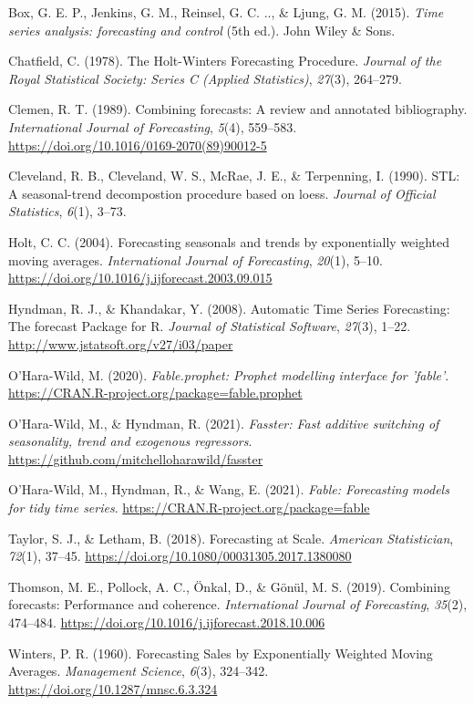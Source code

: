 \begin{appendix}
\hypertarget{refs}{}
\leavevmode\hypertarget{ref-Box2015}{}%
Box, G. E. P., Jenkins, G. M., Reinsel, G. C. .., \& Ljung, G. M.
(2015). \emph{Time series analysis: forecasting and control} (5th ed.).
John Wiley \& Sons.

\leavevmode\hypertarget{ref-Chatfield1978}{}%
Chatfield, C. (1978). The Holt-Winters Forecasting Procedure.
\emph{Journal of the Royal Statistical Society: Series C (Applied
Statistics)}, \emph{27}(3), 264--279.

\leavevmode\hypertarget{ref-Clemen1989}{}%
Clemen, R. T. (1989). Combining forecasts: A review and annotated
bibliography. \emph{International Journal of Forecasting}, \emph{5}(4),
559--583. \url{https://doi.org/10.1016/0169-2070(89)90012-5}

\leavevmode\hypertarget{ref-Cleveland1990}{}%
Cleveland, R. B., Cleveland, W. S., McRae, J. E., \& Terpenning, I.
(1990). STL: A seasonal-trend decompostion procedure based on loess.
\emph{Journal of Official Statistics}, \emph{6}(1), 3--73.

\leavevmode\hypertarget{ref-Holt2004}{}%
Holt, C. C. (2004). Forecasting seasonals and trends by exponentially
weighted moving averages. \emph{International Journal of Forecasting},
\emph{20}(1), 5--10.
\url{https://doi.org/10.1016/j.ijforecast.2003.09.015}

\leavevmode\hypertarget{ref-Hyndman2008}{}%
Hyndman, R. J., \& Khandakar, Y. (2008). Automatic Time Series
Forecasting: The forecast Package for R. \emph{Journal of Statistical
Software}, \emph{27}(3), 1--22.
\url{http://www.jstatsoft.org/v27/i03/paper}

\leavevmode\hypertarget{ref-R-fable.prophet}{}%
O'Hara-Wild, M. (2020). \emph{Fable.prophet: Prophet modelling interface
for 'fable'}. \url{https://CRAN.R-project.org/package=fable.prophet}

\leavevmode\hypertarget{ref-R-fasster}{}%
O'Hara-Wild, M., \& Hyndman, R. (2021). \emph{Fasster: Fast additive
switching of seasonality, trend and exogenous regressors}.
\url{https://github.com/mitchelloharawild/fasster}

\leavevmode\hypertarget{ref-R-fable}{}%
O'Hara-Wild, M., Hyndman, R., \& Wang, E. (2021). \emph{Fable:
Forecasting models for tidy time series}.
\url{https://CRAN.R-project.org/package=fable}

\leavevmode\hypertarget{ref-Taylor2018}{}%
Taylor, S. J., \& Letham, B. (2018). Forecasting at Scale.
\emph{American Statistician}, \emph{72}(1), 37--45.
\url{https://doi.org/10.1080/00031305.2017.1380080}

\leavevmode\hypertarget{ref-Thomson2019}{}%
Thomson, M. E., Pollock, A. C., Önkal, D., \& Gönül, M. S. (2019).
Combining forecasts: Performance and coherence. \emph{International
Journal of Forecasting}, \emph{35}(2), 474--484.
\url{https://doi.org/10.1016/j.ijforecast.2018.10.006}

\leavevmode\hypertarget{ref-Winters1960}{}%
Winters, P. R. (1960). Forecasting Sales by Exponentially Weighted
Moving Averages. \emph{Management Science}, \emph{6}(3), 324--342.
\url{https://doi.org/10.1287/mnsc.6.3.324}

\endgroup

\newpage
\end{appendix}
